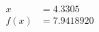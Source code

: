 \documentclass[preview]{standalone}
\begin{document}
\begin{align*}
x &= 4.3305\\f(x) &= 7.9418920
\end{align*}
\end{document}
